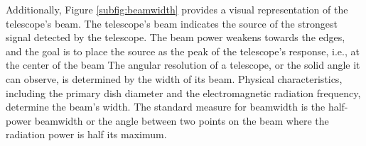 Additionally, Figure \ref{subfig:beamwidth} provides a visual representation of the telescope's beam.
The telescope's beam indicates the source of the strongest signal detected by the telescope.
The beam power weakens towards the edges, and the goal is to place the source as the peak of the telescope's response, i.e., at the center of the beam
The angular resolution of a telescope, or the solid angle it can observe, is determined by the width of its beam.
Physical characteristics, including the primary dish diameter and the electromagnetic radiation frequency, determine the beam's width.
The standard measure for beamwidth is the half-power beamwidth or the angle between two points on the beam where the radiation power is half its maximum.



